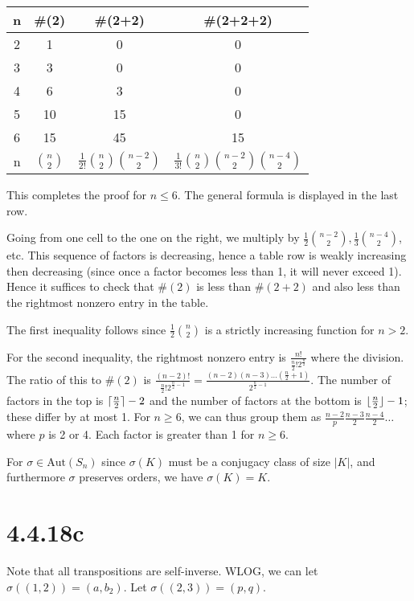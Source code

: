 \documentclass{article}
\DeclarePairedDelimiter\floor{\lfloor}{\rfloor}
\DeclarePairedDelimiter\ceil{\lceil}{\rceil}
\def\Aut{\textrm{Aut}}
\begin{document}
\begin{tabular}{ |c|c|c|c| } 
    \hline
    n & \#(2) & \#(2+2) & \#(2+2+2) \\
    \hline
    2 & 1 & 0 & 0 \\ 
    3 & 3 & 0 & 0 \\ 
    4 & 6 & 3 & 0 \\ 
    5 & 10 & 15 & 0 \\ 
    6 & 15 & 45 & 15 \\ 
    \hline
    n & ${n \choose 2}$ & $\frac{1}{2!}{n \choose 2}{n-2 \choose 2}$ & $\frac{1}{3!}{n \choose 2}{n-2 \choose 2}{n-4 \choose 2}$ \\
    \hline
\end{tabular}

This completes the proof for $n \le 6$. The general formula is displayed in the last row.

Going from one cell to the one on the right, we multiply by $\frac{1}{2}{n-2 \choose 2}, \frac{1}{3}{n-4 \choose 2}$, etc. This sequence of factors is decreasing, hence a table row is weakly increasing then decreasing (since once a factor becomes less than 1, it will never exceed 1). Hence it suffices to check that $\#(2)$ is less than $\#(2+2)$ and also less than the rightmost nonzero entry in the table.

The first inequality follows since $\frac{1}{2}{n \choose 2}$ is a strictly increasing function for $n > 2$.

For the second inequality, the rightmost nonzero entry is $\frac{n!}{\frac{n}{2}! 2^\frac{n}{2}}$ where the division. The ratio of this to $\#(2)$ is $\frac{(n-2)!}{\frac{n}{2}! 2^{\frac{n}{2} - 1}} = \frac{(n-2)(n-3) \ldots (\frac{n}{2} + 1)}{2^{\frac{n}{2}-1}}$. The number of factors in the top is $\ceil{\frac{n}{2}}-2$ and the number of factors at the bottom is $\floor{\frac{n}{2}} - 1$; these differ by at most 1. For $n \ge 6$, we can thus group them as $\frac{n-2}{p} \frac{n-3}{2} \frac{n-4}{2} \ldots$ where $p$ is 2 or 4. Each factor is greater than 1 for $n \ge 6$.

For $\sigma \in \Aut(S_n)$ since $\sigma(K)$ must be a conjugacy class of size $|K|$, and furthermore $\sigma$ preserves orders, we have $\sigma(K) = K$.

\section*{4.4.18c}

Note that all transpositions are self-inverse. WLOG, we can let $\sigma((1, 2)) = (a, b_2)$. Let $\sigma((2, 3)) = (p, q)$.
\end{document}
